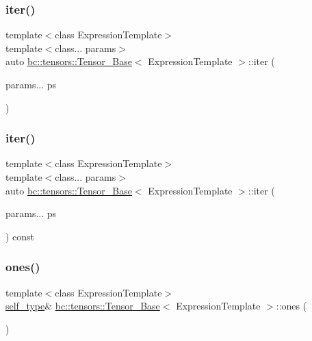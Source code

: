 \subsubsection{\texorpdfstring{iter()}{iter()}\hspace{0.1cm}{\footnotesize\ttfamily [1/2]}}
{\footnotesize\ttfamily template$<$class Expression\+Template$>$ \\
template$<$class... params$>$ \\
auto \hyperlink{classbc_1_1tensors_1_1Tensor__Base}{bc\+::tensors\+::\+Tensor\+\_\+\+Base}$<$ Expression\+Template $>$\+::iter (\begin{DoxyParamCaption}\item[{params...}]{ps }\end{DoxyParamCaption})\hspace{0.3cm}{\ttfamily [inline]}}

\mbox{\label{classbc_1_1tensors_1_1Tensor__Base_a976e88a1c2a72c4d8239f6667c55613c}} 
\subsubsection{\texorpdfstring{iter()}{iter()}\hspace{0.1cm}{\footnotesize\ttfamily [2/2]}}
{\footnotesize\ttfamily template$<$class Expression\+Template$>$ \\
template$<$class... params$>$ \\
auto \hyperlink{classbc_1_1tensors_1_1Tensor__Base}{bc\+::tensors\+::\+Tensor\+\_\+\+Base}$<$ Expression\+Template $>$\+::iter (\begin{DoxyParamCaption}\item[{params...}]{ps }\end{DoxyParamCaption}) const\hspace{0.3cm}{\ttfamily [inline]}}

\mbox{\label{classbc_1_1tensors_1_1Tensor__Base_a5a1eb24a1cfd808939b9782404ceccc4}} 
\subsubsection{\texorpdfstring{ones()}{ones()}}
{\footnotesize\ttfamily template$<$class Expression\+Template$>$ \\
\hyperlink{classbc_1_1tensors_1_1Expression__Base}{self\+\_\+type}\& \hyperlink{classbc_1_1tensors_1_1Tensor__Base}{bc\+::tensors\+::\+Tensor\+\_\+\+Base}$<$ Expression\+Template $>$\+::ones (\begin{DoxyParamCaption}{ }\end{DoxyParamCaption})\hspace{0.3cm}{\ttfamily [inline]}}

